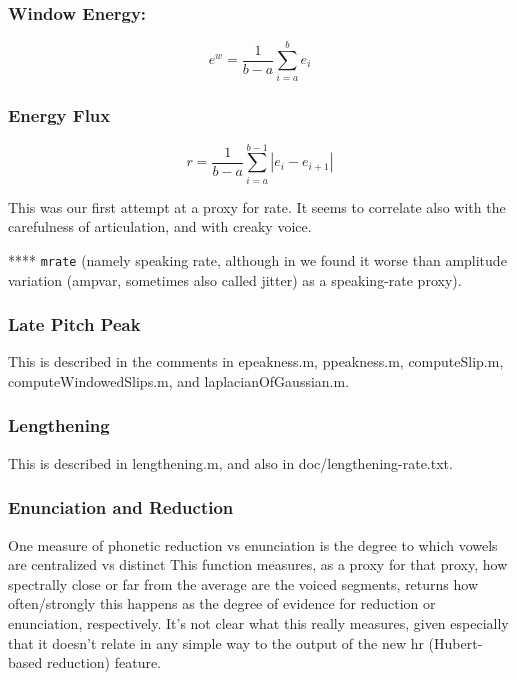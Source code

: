 \documentclass[11pt]{article}
\begin{document}
\bigskip
\subsubsection{Window Energy:}

\begin{equation}
e^w = \frac{1}{b - a} \sum\limits_{i=a}^{b}e_i
\end{equation}

\subsubsection{Energy Flux}
\begin{equation}
r = \frac{1}{b - a} \sum\limits_{i=a}^{b-1}|e_i - e_{i+1}|
\end{equation}

This was our first attempt at a proxy for rate.  It seems to correlate
also with the carefulness of articulation, and with creaky voice.

**** {\tt mrate}
(namely speaking rate, although in \cite{timelm} we found it worse
than amplitude variation (ampvar, sometimes also called jitter) as a
speaking-rate proxy).


\subsubsection{Late Pitch Peak}

This is described in the comments in epeakness.m, ppeakness.m,
computeSlip.m, computeWindowedSlips.m, and laplacianOfGaussian.m. 

\subsubsection{Lengthening}

This is described in lengthening.m, and also in doc/lengthening-rate.txt.

\subsubsection{Enunciation and Reduction}

One measure of phonetic reduction vs enunciation is the degree to which
vowels are centralized vs distinct This function measures, as a proxy
for that proxy, how spectrally close or far from the average are the
voiced segments, returns how often/strongly this happens as the degree
of evidence for reduction or enunciation, respectively.  It's not
clear what this really measures, given especially that it doesn't relate in any
simple way to the output of the new hr (Hubert-based reduction) feature. 
\end{document}
